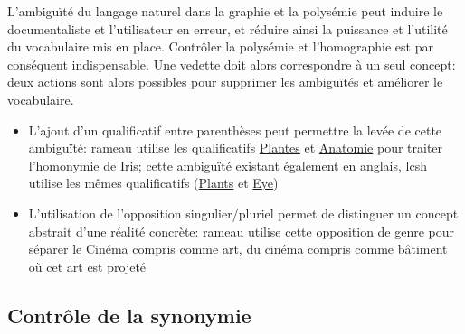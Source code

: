 L'ambiguïté du langage naturel dans la graphie et la polysémie peut induire le documentaliste et l'utilisateur en erreur, et réduire ainsi la puissance et l'utilité du vocabulaire mis en place. Contrôler la polysémie et l'homographie est par conséquent indispensable. Une vedette doit alors correspondre à un seul concept: deux actions sont alors possibles pour supprimer les ambiguïtés et améliorer le vocabulaire.
\begin{itemize}
	\item L'ajout d'un qualificatif entre parenthèses peut permettre la levée de cette ambiguïté: \ac{rameau} utilise les qualificatifs \og \href{https://data.bnf.fr/fr/11935557/iris__plantes_/}{Plantes}\fg{} et \og\href{https://data.bnf.fr/fr/11938389/iris__anatomie_/}{Anatomie}\fg{} pour traiter l'homonymie de \og Iris\fg{}; cette ambiguïté existant également en anglais, \ac{lcsh} utilise les mêmes qualificatifs (\og \href{https://id.loc.gov/authorities/subjects/sh85068079.html}{Plants}\fg{} et \og\href{https://id.loc.gov/authorities/subjects/sh85068076.html}{Eye}\fg{})
	\item L'utilisation de l'opposition singulier/pluriel permet de distinguer un concept abstrait d'une réalité concrète: \ac{rameau} utilise cette opposition de genre pour séparer le \og \href{https://data.bnf.fr/fr/11936118/cinema/}{Cinéma}\fg{} compris comme art, du \og \href{https://data.bnf.fr/fr/11939426/cinemas/}{cinéma}\fg{} compris comme bâtiment où cet art est projeté
\end{itemize}

\subsection{Contrôle de la synonymie}

